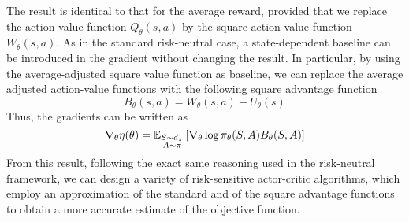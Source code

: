 The result is identical to that for the average reward, provided that we replace the action-value function $Q_\theta(s,a)$ by the square action-value function $W_\theta(s,a)$. As in the standard risk-neutral case, a state-dependent baseline can be introduced in the gradient without changing the result. In particular, by 
using the average-adjusted square value function as baseline, we can replace the 
average adjusted action-value functions with the following square advantage function
\begin{equation}
	B_\theta(s,a) = W_\theta(s,a) - U_\theta(s)
\end{equation}
Thus, the gradients can be written as 
\begin{equation}\label{eq:pg_advantage_W}
	\nabla_\theta \eta(\theta) = \E[\substack{S\sim d_\pi \\ 
A \sim \pi}]{\nabla_\theta \log \pi_\theta(S,A) B_\theta(S,A)}
\end{equation}
From this result, following the exact same reasoning used in the risk-neutral framework, we can design a variety of risk-sensitive actor-critic algorithms, which
employ an approximation of the standard and of the square advantage functions to obtain a more accurate estimate of the objective function. 

